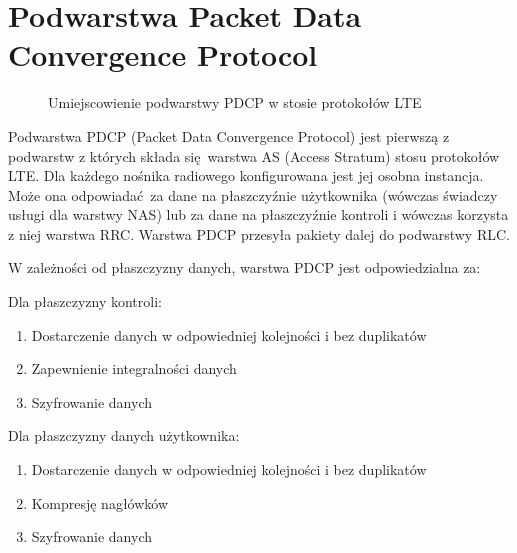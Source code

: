 \chapter{Podwarstwa Packet Data Convergence Protocol}
\label{cha:pdcp}

\begin{figure}[ht]
	\centerline{}
	\caption{Umiejscowienie podwarstwy PDCP w stosie protokołów LTE}
	\label{fig:pdcpseq}
\end{figure}

Podwarstwa PDCP (Packet Data Convergence Protocol) jest pierwszą z podwarstw z których składa się warstwa AS (Access Stratum) stosu protokołów LTE. Dla każdego nośnika radiowego konfigurowana jest jej osobna instancja. Może ona odpowiadać za dane na płaszczyźnie użytkownika (wówczas świadczy usługi dla warstwy NAS) lub za dane na płaszczyźnie kontroli i wówczas korzysta z niej warstwa RRC. Warstwa PDCP przesyła pakiety dalej do podwarstwy RLC.

W zależności od płaszczyzny danych, warstwa PDCP jest odpowiedzialna za:

Dla płaszczyzny kontroli:
\begin{enumerate}
	\item Dostarczenie danych w odpowiedniej kolejności i bez duplikatów
	\item Zapewnienie integralności danych
	\item Szyfrowanie danych
\end{enumerate}

Dla płaszczyzny danych użytkownika:
\begin{enumerate}
	\item Dostarczenie danych w odpowiedniej kolejności i bez duplikatów
	\item Kompresję nagłówków
	\item Szyfrowanie danych
\end{enumerate}

